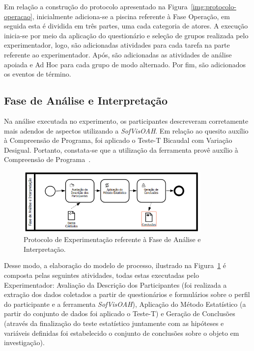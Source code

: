 Em relação a construção do protocolo apresentado na Figura~\ref{img:protocolo-operacao}, inicialmente adiciona-se a piscina referente à Fase Operação, em seguida esta é dividida em três partes, uma cada categoria de atores. A execução inicia-se por meio da aplicação do questionário e seleção de grupos realizada pelo experimentador, logo, são adicionadas atividades para cada tarefa na parte referente ao experimentador. Após, são adicionadas as atividades de análise apoiada e Ad Hoc para cada grupo de modo alternado. Por fim, são adicionados os eventos de término.


\subsection{Fase de Análise e Interpretação}

Na análise executada no experimento, os participantes descreveram corretamente mais adendos de aspectos utilizando a \textit{SofVisOAH}. Em relação ao quesito auxílio à Compreensão de Programa, foi aplicado o Teste-T Bicaudal com Variação Desigual. Portanto, constata-se que a utilização da ferramenta provê auxílio à Compreensão de Programa~\cite{d2012avaliaccao}.

\begin{figure}[!htb]
\centering
\includegraphics[width=0.85\textwidth]{images/protocolo-analise.png}
\caption{Protocolo de Experimentação referente à Fase de Análise e Interpretação.}
\label{img:protocolo-analise}
\end{figure}

Desse modo, a elaboração do modelo de processo, ilustrado na Figura~\ref{img:protocolo-analise} é composta pelas seguintes atividades, todas estas executadas pelo Experimentador: Avaliação da Descrição dos Participantes (foi realizada a extração dos dados coletados a partir de questionários e formulários sobre o perfil do participante e a ferramenta \textit{SofVisOAH}), Aplicação do Método Estatístico (a partir do conjunto de dados foi aplicado o Teste-T) e Geração de Conclusões (através da finalização do teste estatístico juntamente com as hipóteses e variáveis definidas foi estabelecido o conjunto de conclusões sobre o objeto em investigação).


